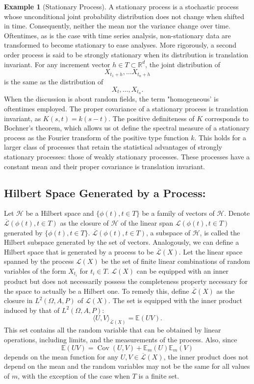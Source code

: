 \documentclass[psamsfonts]{amsart}
\theoremstyle{definition}
\newtheorem{exmp}[thm]{Example}
\theoremstyle{remark}
\DeclareMathOperator{\Cov}{Cov}
\numberwithin{equation}{section}
\begin{document}
\begin{exmp}[Stationary Process]
A stationary process is a stochastic process whose unconditional joint probability distribution does not change when shifted in time. Consequently, neither the mean nor the variance change over time. Oftentimes, as is the case with time series analysis, non-stationary data are transformed to become stationary to ease analyses. More rigorously, a second order process is said to be strongly stationary when its distribution is translation invariant. For any increment vector $h \in T \subset \mathbb{R}^d$, the joint distribution of 
$$X_{t_1 + h} , \dots X_{t_n + h} $$
is the same as the distribution of 
$$X_t , \dots , X_{t_n}. $$
When the discussion is about random fields, the term "homogeneous' is oftentimes employed. The proper covariance of a stationary process is translation invariant, as $K(s,t) = k(s-t)$. The positive definiteness of $K$ corresponds to Bochner's theorem, which allows us ot define the spectral measure of a stationary process as the Fourier transform of the positive type function $k$. This holds for a larger class of processes that retain the statistical advantages of strongly stationary processes: those of weakly stationary processes. These processes have a constant mean and their proper covariance is translation invariant.
\end{exmp}

\subsection{Hilbert Space Generated by a Process:}
Let $\mathcal{H}$ be a Hilbert space and $\{ \phi (t) , t \in T \}$ be a family of vectors of $\mathcal{H}$. Denote $\overline{\mathcal{L}}(\phi (t), t \in T)$ as the closure of $\mathcal{H}$ of the linear span $\mathcal{L}(\phi (t), t \in T)$ generated by $\{ \phi (t) , t \in T \}$. $\overline{\mathcal{L}}(\phi (t), t \in T)$, a subspace of $\mathcal{H}$, is called the Hilbert subspace generated by the set of vectors. Analogously, we can define a Hilbert space that is generated by a process to be $\overline{\mathcal{L}} (X).$ Let the linear space spanned by the process $\mathcal{L}(X)$ be the set of finite linear combinations of random variables of the form $X_{t_i}$ for $t_i \in T$. $\mathcal{L}(X)$ can be equipped with an inner product but does not necessarily possess the completeness property necessary for the space to actually be a Hilbert one. To remedy this, define $\overline{\mathcal{L}} (X)$ as the closure in $L^2 (\Omega, A, P)$ of $\mathcal{L}(X).$ The set is equipped with the inner product induced by that of $L^2 (\Omega, A, P)$: 
$$\langle U, V \rangle _{\overline{\mathcal{L}} (X)} = \mathbb{E} (UV). $$
This set contains all the random variable that can be obtained by linear operations, including limits, and the measurements of the process. Also, since $$\mathbb{E} (UV) = \Cov (U,V) + \mathbb{E}_m (U) \mathbb{E}_m (V)$$
depends on the mean function for any $U, V \in \overline{\mathcal{L}} (X)$, the inner product does not depend on the mean and the random variables may not be the same for all values of $m$, with the exception of the case when $T$ is a finite set. 
\end{document}
